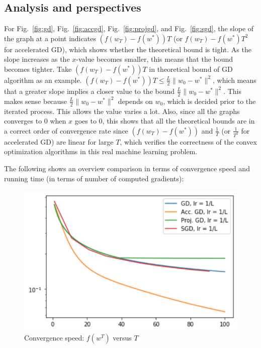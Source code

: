 \documentclass[10pt,conference,compsocconf]{IEEEtran}
\begin{document}
\subsection{Analysis and perspectives}
For Fig.~\ref{fig:gd}, Fig.~\ref{fig:accgd}, Fig.~\ref{fig:projgd}, and Fig.~\ref{fig:sgd},  the slope of the graph at a point indicates $(f(w_T)-f(w^*))T$ (or $f(w_T)-f(w^*)T^2$ for accelerated GD), which shows whether the theoretical bound is tight. As the slope increases as the $x$-value becomes smaller, this means that the bound becomes tighter. Take $(f(w_T)-f(w^*))T$ in theoretical bound of GD algorithm as an example. $(f(w_T)-f(w^*))T\leq\frac{L}{2}\|w_0-w^*\|^2$, which means that a greater slope implies a closer value to the bound $\frac{L}{2}\|w_0-w^*\|^2$. This makes sense because $\frac{L}{2}\|w_0-w^*\|^2$ depends on $w_0$, which is decided prior to the iterated process. This allows the value varies a lot. Also, since all the graphs converges to 0 when $x$ goes to 0, this shows that all the theoretical bounds are in a correct order of convergence rate since $(f(w_T)-f(w^*))$ and $\frac{1}{T}$ (or $\frac{1}{T^2}$ for accelerated GD) are linear for large $T$, which verifies the correctness of the convex optimization algorithms in this real machine learning problem.\par
The following shows an overview comparison in terms of convergence speed and running time (in terms of number of computed gradients):\par
\begin{figure}[tbp]
  \centering
  \includegraphics[width=\columnwidth]{compare_iter}
  \caption{Convergence speed: $f(w^T)$ versus $T$}
  \vspace{-3mm}
  \label{fig:compare_iter}
\end{figure}
\end{document}
